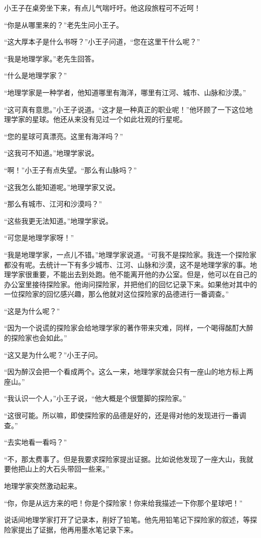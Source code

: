 小王子在桌旁坐下来，有点儿气喘吁吁。他这段旅程可不近呵！

“你是从哪里来的？”老先生问小王子。

“这大厚本子是什么书呀？”小王子问道，“您在这里干什么呢？”

“我是地理学家。”老先生回答。

“什么是地理学家？”

“地理学家是一种学者，他知道哪里有海洋，哪里有江河、城市、山脉和沙漠。”

“这可真有意思。”小王子说道。“这才是一种真正的职业呢！”他环顾了一下这位地理学家的星球。他还从来没有见过一个如此壮观的行星呢。

“您的星球可真漂亮。这里有海洋吗？”

“这我可不知道。”地理学家说。

“啊！”小王子有点失望。“那么有山脉吗？”

“这我怎么能知道呢。”地理学家又说。

“那么有城市、江河和沙漠吗？”

“这些我更无法知道。”地理学家说。

“可您是地理学家呀！”

“我是地理学家，一点儿不错。”地理学家说道。“可我不是探险家。我连一个探险家都没有呢。去统计一下有多少城市、江河、山脉和沙漠，这不是地理学家的事。地理学家很重要，不能出去到处跑。他不能离开他的办公室。但是，他可以在自己的办公室里接待探险家。他询问探险家，并把他们的回忆记录下来。如果他对其中的一位探险家的回忆感兴趣，那么他就对这位探险家的品德进行一番调查。”

“这是为什么呢？”

“因为一个说谎的探险家会给地理学家的著作带来灾难，同样，一个喝得酩酊大醉的探险家也会如此。”

“这又是为什么呢？”小王子问。

“因为醉汉会把一个看成两个。这么一来，地理学家就会只有一座山的地方标上两座山。”

“我认识一个人，”小王子说，“他大概是个很蹩脚的探险家。”

“这很可能。所以嘛，即使探险家的品德是好的，还是得对他的发现进行一番调查。”

“去实地看一看吗？”

“不，那太费事了。但是我要求探险家提出证据。比如说他发现了一座大山，我就要他把山上的大石头带回一些来。”

地理学家突然激动起来。

“你，你是从远方来的吧！你是个探险家！你来给我描述一下你那个星球吧！”

说话间地理学家打开了记录本，削好了铅笔。他先用铅笔记下探险家的叙述，等探险家提出了证据，他再用墨水笔记录下来。

